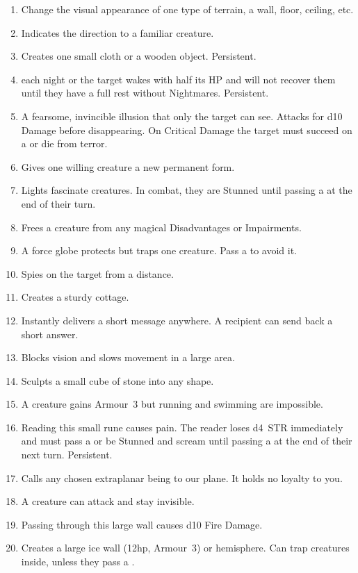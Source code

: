 \documentclass[itdr]{subfiles}
\begin{document}
\begin{enumerate}
	\item {} Change the visual appearance of one type of terrain, a wall, floor, ceiling, etc.
	\item {} Indicates the direction to a familiar creature.
	\item {} Creates one small cloth or a wooden object. Persistent.
	\vfill
	\break
	\item {}  each night or the target wakes with half its HP and will not recover them until they have a full rest without Nightmares. Persistent.
	\item {} A fearsome, invincible illusion that only the target can see. Attacks for d10 Damage before disappearing. On Critical Damage the target must succeed on a  or die from terror.
	\item {} Gives one willing creature a new permanent form.
	\item {} Lights fascinate creatures. In combat, they are Stunned until passing a  at the end of their turn.
	\item {} Frees a creature from any magical Disadvantages or Impairments.
	\item {} A force globe protects but traps one creature. Pass a  to avoid it.
	\item {} Spies on the target from a distance.
	\item {} Creates a sturdy cottage.
	\item {} Instantly delivers a short message anywhere. A recipient can send back a short \mbox{answer}.
	\item {} Blocks vision and slows movement in a large area.
	\item {} Sculpts a small cube of stone into any shape.
	\item {} A creature gains Armour~3 but running and swimming are impossible.
	\item {} Reading this small rune causes pain. The reader loses d4~STR immediately and must pass a  or be Stunned and scream until passing a  at the end of their next turn. Persistent.
	\item {} Calls any chosen extraplanar being to our plane. It holds no loyalty to you.
	\item {} A creature can attack and stay invisible.
	\item {} Passing through this large wall causes d10 Fire Damage.
	\item {} Creates a large ice wall (12hp, Armour~3) or hemisphere. Can trap creatures inside, unless they pass a .
\end{enumerate}
\end{document}
